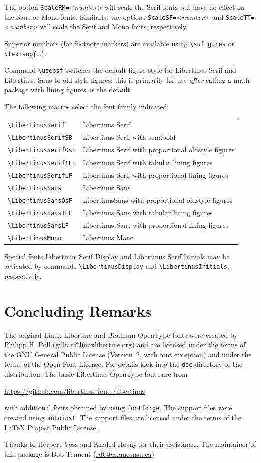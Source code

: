 \documentclass[11pt]{article}
\begin{document}
The option 
\verb|ScaleRM=|<\emph{number}> will scale the Serif fonts but have no effect on the
Sans or Mono fonts. Similarly, the options
\verb|ScaleSF=|<\emph{number}>
and \verb|ScaleTT=|<\emph{number}>
will scale the Serif and Mono fonts, respectively.  

Superior numbers (for footnote markers) are available using \verb|\sufigures|
or \verb|\textsup{|\ldots\verb|}|.


Command \verb|\useosf| switches the default figure style for Libertinus Serif and Libertinus Sans to old-style figures; this is
primarily for use \emph{after} calling a math package 
with lining figures as the default.

The following macros select the font family indicated:
\begin{center}
\begin{tabular}{ll}
\verb|\LibertinusSerif| & Libertinus Serif \\
\verb|\LibertinusSerifSB|& Libertinus Serif with semibold \\
\verb|\LibertinusSerifOsF| & Libertinus Serif with proportional oldstyle figures \\
\verb|\LibertinusSerifTLF| & Libertinus Serif with tabular lining figures \\
\verb|\LibertinusSerifLF| & Libertinus Serif with proportional lining figures \\
\verb|\LibertinusSans| & Libertinus Sans \\
\verb|\LibertinusSansOsF|& LibertinusSans with proportional oldstyle figures \\
\verb|\LibertinusSansTLF| & Libertinus Sans with tabular lining figures \\
\verb|\LibertinusSansLF| & Libertinus Sans with proportional lining figures \\
\verb|\LibertinusMono| & Libertinus Mono\\
\end{tabular}
\end{center}
Special fonts Libertinus Serif Display and Libertinus Serif Initials may be
activated by commands
\verb|\LibertinusDisplay|  and \verb|\LibertinusInitials|, respectively.

\section{Concluding Remarks}


The original Linux Libertine and Biolinum OpenType fonts were created by Philipp H. Poll 
(\url{gillian@linuxlibertine.org}) and are licensed under the terms of the GNU General
Public License (Version~2, with font exception) and under the terms of
the Open Font License. For details look into the \verb|doc| directory of the
distribution.
The basic Libertinus OpenType fonts are from 
\begin{list}{}{}\item
\url{https://github.com/libertinus-fonts/libertinus}
\end{list}
with additional fonts obtained by using \verb|fontforge|.
The support
files were created using \verb|autoinst|. The support files are licensed under
the terms of the LaTeX Project Public License.  

Thanks to Herbert Voss
and Khaled Hosny for their assistance.
The maintainer of this
package is Bob Tennent (\url{rdt@cs.queensu.ca})
\end{document}
